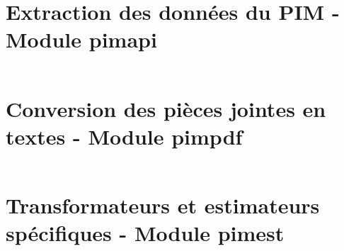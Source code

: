 \documentclass{report}
\begin{document}
    \section{Extraction des données du PIM - Module pimapi}
    \label{code:pimapi}
    \begin{multicols}{2}
    \begin{spacing}{1.0}
    \inputminted[fontsize=\tiny]{python}{../src/pimapi.py}
    \end{spacing}
    \end{multicols}

    \section{Conversion des pièces jointes en textes - Module pimpdf}
    \label{code:pimpdf}
    \begin{multicols}{2}
    \begin{spacing}{1.0}
    \inputminted[fontsize=\tiny]{python}{../src/pimpdf.py}
    \end{spacing}
    \end{multicols}
    
    \section{Transformateurs et estimateurs spécifiques - Module pimest}
    \label{code:pimest}
    \begin{multicols}{2}
    \begin{spacing}{1.0}
    \inputminted[fontsize=\tiny]{python}{../src/pimest.py}
    \end{spacing}
    \end{multicols}
\end{document}
